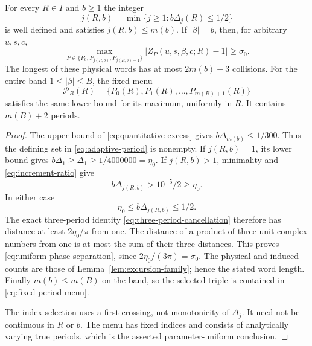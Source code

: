 \begin{theorem}
\label{thm:uniform-phase-separation}
For every $R\in I$ and $b\ge1$ the integer
\begin{equation}\label{eq:adaptive-period}
 j(R,b)=\min\{j\ge1:b\Delta_j(R)\le1/2\}
\end{equation}
is well defined and satisfies $j(R,b)\le m(b)$. If $|\beta|=b$,
then, for arbitrary $u,s,c$,
\begin{equation}\label{eq:uniform-phase-separation}
 \max_{P\in\{P_0,P_{j(R,b)},P_{j(R,b)+1}\}}
       |Z_P(u,s,\beta,c;R)-1|\ge\sigma_0.
\end{equation}
The longest of these physical words has at most $2m(b)+3$ collisions.
For the entire band $1\le|\beta|\le B$, the fixed menu
\begin{equation}\label{eq:fixed-period-menu}
 \mathcal P_B(R)=\{P_0(R),P_1(R),\ldots,P_{m(B)+1}(R)\}
\end{equation}
satisfies the same lower bound for its maximum, uniformly in $R$.
It contains $m(B)+2$ periods.
\end{theorem}
\begin{proof}
The upper bound of \eqref{eq:quantitative-excess} gives
$b\Delta_{m(b)}\le1/300$. Thus the defining set in
\eqref{eq:adaptive-period} is nonempty. If $j(R,b)=1$, its lower
bound gives $b\Delta_1\ge\Delta_1\ge1/4000000=\eta_0$.
If $j(R,b)>1$, minimality and \eqref{eq:increment-ratio} give
\[
 b\Delta_{j(R,b)}>10^{-5}/2\ge\eta_0.
\]
In either case
\begin{equation}\label{eq:selected-phase-window}
 \eta_0\le b\Delta_{j(R,b)}\le1/2.
\end{equation}
The exact three-period identity \eqref{eq:three-period-cancellation}
therefore has distance at least $2\eta_0/\pi$ from one. The distance
of a product of three unit complex numbers from one is at most the
sum of their three distances. This proves
\eqref{eq:uniform-phase-separation}, since
$2\eta_0/(3\pi)=\sigma_0$. The physical and induced counts are
those of Lemma~\ref{lem:excursion-family}; hence the stated word
length. Finally $m(b)\le m(B)$ on the band, so the selected triple
is contained in \eqref{eq:fixed-period-menu}.

The index selection uses a first crossing, not monotonicity of
$\Delta_j$. It need not be continuous in $R$ or $b$. The menu has
fixed indices and consists of analytically varying true periods,
which is the asserted parameter-uniform conclusion.
\end{proof}

